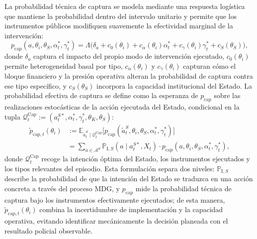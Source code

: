 \documentclass[pdflatex,sn-mathphys-ay]{sn-jnl}
\theoremstyle{thmstyleone}
\theoremstyle{thmstyletwo}
\theoremstyle{thmstylethree}
\newcommand{\E}{\mathbb{E}}
\newcommand{\1}{\mathbf{1}}
\newcommand{\ProbI}[1]{\mathbb{P}_{\mathrm{I},#1}}
\begin{document}
La probabilidad técnica de captura se modela mediante una respuesta logística que mantiene la probabilidad dentro del intervalo unitario y permite que los instrumentos públicos modifiquen suavemente la efectividad marginal de la intervención:
\begin{equation}
p_{\mathrm{cap}}(a,\theta_i,\theta_S,\alpha_t^\ast,\gamma_t^\ast)=\Lambda\bigl(\delta_a+c_0(\theta_i)+c_\alpha(\theta_i)\alpha_t^\ast+c_\gamma(\theta_i)\gamma_t^\ast+c_S(\theta_S)\bigr),
\label{eq:p-cap}
\end{equation}
donde $\delta_a$ captura el impacto del propio modo de intervención ejecutado, $c_0(\theta_i)$ permite heterogeneidad basal por tipo, $c_\alpha(\theta_i)$ y $c_\gamma(\theta_i)$ capturan cómo el bloque financiero y la presión operativa alteran la probabilidad de captura contra ese tipo específico, y $c_S(\theta_S)$ incorpora la capacidad institucional del Estado. La probabilidad efectiva de captura se define como la esperanza de $p_{\mathrm{cap}}$ sobre las realizaciones estocásticas de la acción ejecutada del Estado, condicional en la tupla $\mathcal{Q}_t^{\mathrm{Cap}}:=(a_t^{S\ast},\alpha_t^\ast,\gamma_t^\ast,\theta_K,\theta_S)$:
\begin{align}
\tilde{p}_{\mathrm{cap},t}(\theta_i)
&:=\E_{\tilde{a}_t^S\mid\mathcal{Q}_t^{\mathrm{Cap}}}\!\bigl[p_{\mathrm{cap}}(\tilde{a}_t^S,\theta_i,\theta_S,\alpha_t^\ast,\gamma_t^\ast)\bigr]\nonumber\\
&=\sum_{a\in\mathcal{A}^S}\ProbI{S}(a\mid a_t^{S\ast},X_t)\cdot p_{\mathrm{cap}}(a,\theta_i,\theta_S,\alpha_t^\ast,\gamma_t^\ast),
\label{eq:p-cap-tilde}
\end{align}
donde $\mathcal{Q}_t^{\mathrm{Cap}}$ recoge la intención óptima del Estado, los instrumentos ejecutados y los tipos relevantes del episodio. Esta formulación separa dos niveles: $\ProbI{S}$ describe la probabilidad de que la intención del Estado se traduzca en una acción concreta a través del proceso MDG, y $p_{\mathrm{cap}}$ mide la probabilidad técnica de captura bajo los instrumentos efectivamente ejecutados; de esta manera, $\tilde{p}_{\mathrm{cap},t}(\theta_i)$ combina la incertidumbre de implementación y la capacidad operativa, evitando identificar mecánicamente la decisión planeada con el resultado policial observable.
\end{document}
